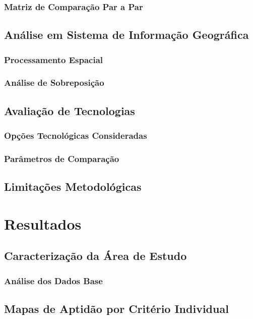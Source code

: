 \documentclass[12pt, a4paper]{article}
\begin{document}
\subsubsection{Matriz de Comparação Par a Par}

\subsection{Análise em Sistema de Informação Geográfica}
\subsubsection{Processamento Espacial}
\subsubsection{Análise de Sobreposição}

\subsection{Avaliação de Tecnologias}
\subsubsection{Opções Tecnológicas Consideradas}
\subsubsection{Parâmetros de Comparação}

\subsection{Limitações Metodológicas}

\section{Resultados}
\subsection{Caracterização da Área de Estudo}
\subsubsection{Análise dos Dados Base}

\subsection{Mapas de Aptidão por Critério Individual}
\end{document}
